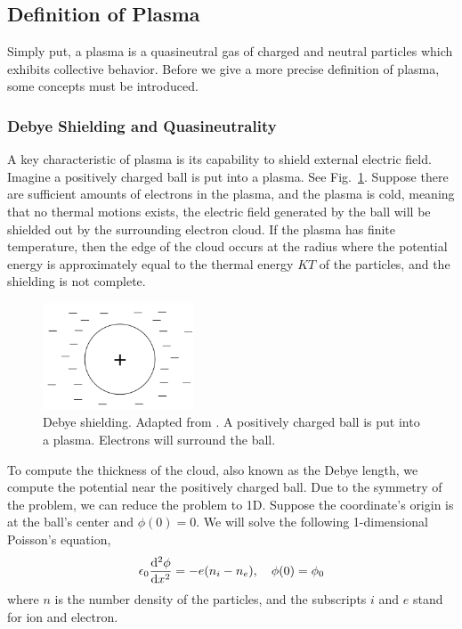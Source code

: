 \subsection{Definition of Plasma}
Simply put, a plasma is a quasineutral gas of charged and neutral particles which exhibits collective behavior. \cite{chen_introduction_2016} Before we give a more precise definition of plasma, some concepts must be introduced.

\subsubsection*{Debye Shielding and Quasineutrality}
A key characteristic of plasma is its capability to shield external electric field. \cite{chen_introduction_2016} Imagine a positively charged ball is put into a plasma. See Fig.~\ref{fig:debye-shielding}. Suppose there are sufficient amounts of electrons in the plasma, and the plasma is cold, meaning that no thermal motions exists, the electric field generated by the ball will be shielded out by the surrounding electron cloud. If the plasma has finite temperature, then the edge of the cloud occurs at the radius where the potential energy is approximately equal to the thermal energy $KT$ of the particles, and the shielding is not complete.

\begin{figure}[htbp]
	\centering
	\includegraphics[width=0.4\textwidth]{figures/debye-shielding.png}
	\caption{Debye shielding. Adapted from \cite{chen_introduction_2016}. A positively charged ball is put into a plasma. Electrons will surround the ball.}
	\label{fig:debye-shielding}
\end{figure}

To compute the thickness of the cloud, also known as the Debye length, we compute the potential near the positively charged ball. Due to the symmetry of the problem, we can reduce the problem to 1D. Suppose the coordinate's origin is at the ball's center and $\phi(0)=0$. We will solve the following 1-dimensional Poisson's equation,
\begin{equation}
	\epsilon_0\dv[2]{\phi}{x} = -e(n_i - n_e), \quad \phi(0) = \phi_0
\end{equation}
where $n$ is the number density of the particles, and the subscripts $i$ and $e$ stand for ion and electron.

